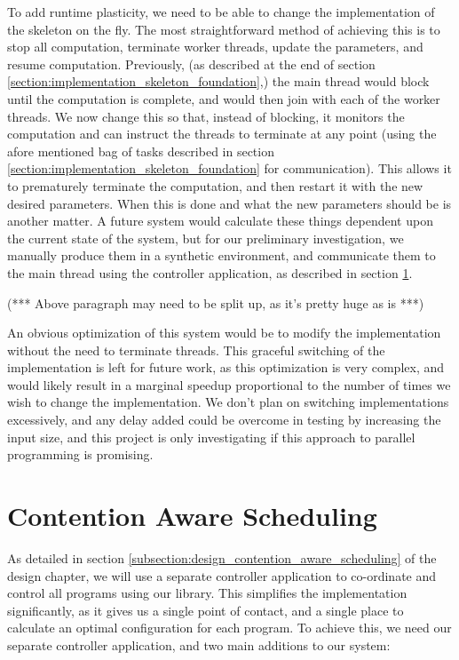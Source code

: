 To add runtime plasticity, we need to be able to change the implementation of the skeleton on the fly. The most straightforward method of achieving this is to stop all computation, terminate worker threads, update the parameters, and resume computation. Previously, (as described at the end of section \ref{section:implementation_skeleton_foundation},) the main thread would block until the computation is complete, and would then join with each of the worker threads. We now change this so that, instead of blocking, it monitors the computation and can instruct the threads to terminate at any point (using the afore mentioned bag of tasks described in section \ref{section:implementation_skeleton_foundation} for communication). This allows it to prematurely terminate the computation, and then restart it with the new desired parameters. When this is done and what the new parameters should be is another matter. A future system would calculate these things dependent upon the current state of the system, but for our preliminary investigation, we manually produce them in a synthetic environment, and communicate them to the main thread using the controller application, as described in section \ref{section:implementation_contention_aware_scheduling}.

(*** Above paragraph may need to be split up, as it's pretty huge as is ***)



An obvious optimization of this system would be to modify the implementation without the need to terminate threads. This graceful switching of the implementation is left for future work, as this optimization is very complex, and would likely result in a marginal speedup proportional to the number of times we wish to change the implementation. We don't plan on switching implementations excessively, and any delay added could be overcome in testing by increasing the input size, and this project is only investigating if this approach to parallel programming is promising.



\section{Contention Aware Scheduling}
\label{section:implementation_contention_aware_scheduling}

As detailed in section \ref{subsection:design_contention_aware_scheduling} of the design chapter, we will use a separate controller application to co-ordinate and control all programs using our library. This simplifies the implementation significantly, as it gives us a single point of contact, and a single place to calculate an optimal configuration for each program. To achieve this, we need our separate controller application, and two main additions to our system:

